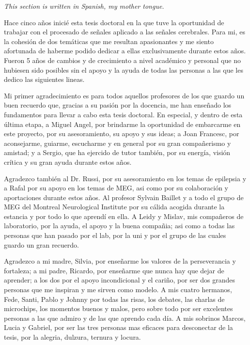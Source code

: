 \cleardoublepage


\begin{acknowledgements}
\textit{This section is written in Spanish, my mother tongue.}

Hace cinco años inicié esta tesis doctoral en la que tuve la oportunidad de trabajar con el procesado de señales aplicado a las señales cerebrales. Para mi, es la cohesión de dos temáticas que me resultan apasionantes y me siento afortunada de haberme podido dedicar a ellas exclusivamente durante estos años. Fueron 5 años de cambios y de crecimiento a nivel académico y personal que no hubiesen sido posibles sin el apoyo y la ayuda de todas las personas a las que les dedico las siguientes lineas.  

Mi primer agradecimiento es para todos aquellos profesores de los que guardo un buen recuerdo que, gracias a su pasión por la docencia, me han enseñado los fundamentos para llevar a cabo esta tesis doctoral. En especial, y dentro de esta última etapa, a Miguel Angel, por brindarme la oportunidad de embarcarme en este proyecto, por su asesoramiento, su apoyo y sus ideas; a Joan Francesc, por aconsejarme, guiarme, escucharme y en general por su gran compañerismo y amistad; y a Sergio, que ha ejercido de tutor también, por su energía, visión crítica y su gran ayuda durante estos años.

Agradezco también al Dr. Russi, por su asesoramiento en los temas de epilepsia y a Rafal por su apoyo en los temas de MEG, asi como por su colaboración y aportaciones durante estos años. Al profesor Sylvain Baillet y a todo el grupo de MEG del Montreal Neurological Institute por su cálida acogida durante la estancia y por todo lo que aprendí en ella. A Leidy y Mislav, mis compañeros de laboratorio, por la ayuda, el apoyo y la buena compañia; asi como a todas las personas que han pasado por el lab, por la uni y por el grupo de las cuales guardo un gran recuerdo.

Agradezco a mi madre, Silvia, por enseñarme los valores de la perseverancia y fortaleza; a mi padre, Ricardo, por enseñarme que nunca hay que dejar de aprender; a los dos por el apoyo incondicional y el cariño, por ser dos grandes personas que me inspiran y me sirven como modelo. A mis cuatro hermanos, Fede, Santi, Pablo y Johnny por todas las risas, los debates, las charlas de microchips, los momentos buenos y malos, pero sobre todo por ser excelentes personas a las que admiro y de las que aprendo cada día. A mis sobrinos Marcos, Lucia y Gabriel, por ser las tres personas mas eficaces para desconectar de la tesis, por la alegria, dulzura, ternura y locura. 


\end{acknowledgements}

